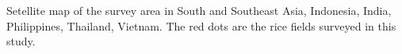 Setellite map of the survey area in South and Southeast Asia, Indonesia, India, Philippines, Thailand, Vietnam. The red dots are the rice fields surveyed in this study.